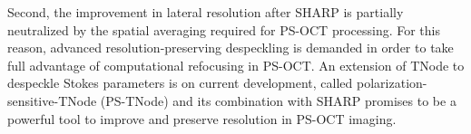 Second, the improvement in lateral resolution after SHARP is partially neutralized by the spatial averaging required for PS-OCT processing. For this reason, advanced resolution-preserving despeckling is demanded in order to take full advantage of computational refocusing in PS-OCT. An extension of TNode to despeckle Stokes parameters is on current development, called polarization-sensitive-TNode (PS-TNode) and its combination with SHARP promises to be a powerful tool to improve and preserve resolution in PS-OCT imaging.